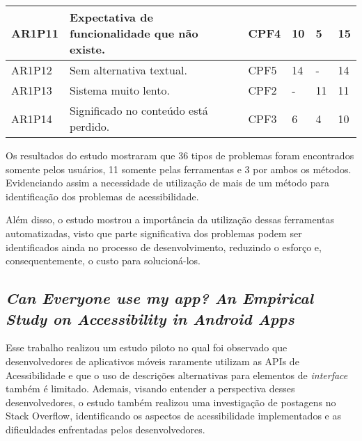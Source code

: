 \begin{table}[htb]
\begin{center}
\begin{tabular}{p{1.2cm}|p{8.7cm}|p{1.4cm}|p{0.6cm}|p{0.6cm}|p{0.7cm}}
      \hline
      AR1P11          & Expectativa de funcionalidade que não existe.                            & CPF4               & 10           & 5            & 15             \\
      \hline
      AR1P12          & Sem alternativa textual.                                                 & CPF5               & 14           & -            & 14             \\
      \hline
      AR1P13          & Sistema muito lento.                                                     & CPF2               & -            & 11           & 11             \\
      \hline
      AR1P14          & Significado no conteúdo está perdido.                                    & CPF3               & 6            & 4            & 10             \\
    \end{tabular}
  \end{center}
\end{table}

Os resultados do estudo mostraram que 36 tipos de problemas foram encontrados somente pelos usuários, 11 somente pelas ferramentas
e 3 por ambos os métodos. Evidenciando assim a necessidade de utilização de mais de um método para identificação dos problemas de
acessibilidade.

Além disso, o estudo mostrou a importância da utilização dessas ferramentas automatizadas, visto que parte significativa dos problemas
podem ser identificados ainda no processo de desenvolvimento, reduzindo o esforço e, consequentemente, o custo para solucioná-los.

\subsection{\emph{Can Everyone use my app? An Empirical Study on Accessibility in Android Apps}}

Esse trabalho realizou um estudo piloto no qual foi observado que desenvolvedores de aplicativos móveis raramente utilizam as APIs de Acessibilidade e que o uso de descrições alternativas para elementos de \emph{interface} também é limitado.
Ademais, visando entender a perspectiva desses desenvolvedores, o estudo também realizou uma investigação de postagens no Stack Overflow, identificando os aspectos de acessibilidade implementados e as dificuldades enfrentadas pelos desenvolvedores.

